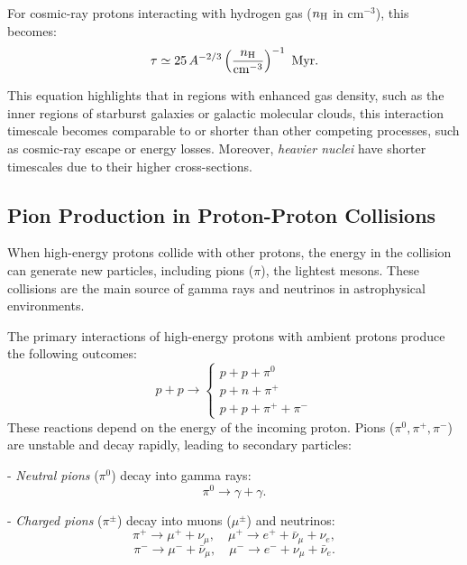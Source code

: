 For cosmic-ray protons interacting with hydrogen gas (\(n_{\rm H}\) in \(\text{cm}^{-3}\)), this becomes:
\begin{equation}
\tau \simeq 25 \, A^{-2/3} \left( \frac{n_{\rm H}}{\text{cm}^{-3}} \right)^{-1}~\text{Myr}.
\end{equation}

This equation highlights that in regions with enhanced gas density, such as the inner regions of starburst galaxies or galactic molecular clouds, this interaction timescale becomes comparable to or shorter than other competing processes, such as cosmic-ray escape or energy losses. 
Moreover, \emph{heavier nuclei} have shorter timescales due to their higher cross-sections.

\subsection{Pion Production in Proton-Proton Collisions}

When high-energy protons collide with other protons, the energy in the collision can generate new particles, including pions (\(\pi\)), the lightest mesons. These collisions are the main source of gamma rays and neutrinos in astrophysical environments. 

The primary interactions of high-energy protons with ambient protons produce the following outcomes:
\begin{equation}
p + p \rightarrow 
\begin{cases}
p + p + \pi^0 \\
p + n + \pi^+  \\
p + p + \pi^+ + \pi^-
\end{cases}
\end{equation}
These reactions depend on the energy of the incoming proton. Pions (\(\pi^0, \pi^+, \pi^-\)) are unstable and decay rapidly, leading to secondary particles:

- \emph{Neutral pions} (\(\pi^0\)) decay into gamma rays:
\begin{equation}
\pi^0 \rightarrow \gamma + \gamma.
\end{equation}

- \emph{Charged pions} (\(\pi^\pm\)) decay into muons (\(\mu^\pm\)) and neutrinos:
\begin{equation}
\pi^+ \rightarrow \mu^+ + \nu_\mu, \quad \mu^+ \rightarrow e^+ + \bar{\nu}_\mu + \nu_e,
\end{equation}
\begin{equation}
\pi^- \rightarrow \mu^- + \bar{\nu}_\mu, \quad \mu^- \rightarrow e^- + \nu_\mu + \bar{\nu}_e.
\end{equation}


